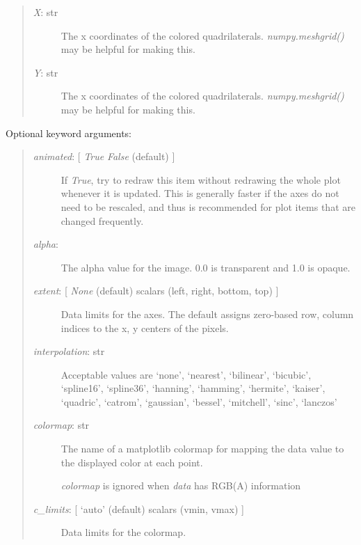 \documentclass[letterpaper,10pt,english]{sphinxmanual}
\begin{document}
\begin{fulllineitems}
\begin{fulllineitems}
\begin{quote}
\begin{description}
\item[{\emph{X}: str}] \leavevmode
The x coordinates of the colored quadrilaterals.
\emph{numpy.meshgrid()} may be helpful for making this.

\item[{\emph{Y}: str}] \leavevmode
The x coordinates of the colored quadrilaterals.
\emph{numpy.meshgrid()} may be helpful for making this.

\end{description}
\end{quote}

Optional keyword arguments:
\begin{quote}
\begin{description}
\item[{\emph{animated}: {[} \emph{True} \textbar{} \emph{False} (default) {]}}] \leavevmode
If \emph{True}, try to redraw this item without redrawing the whole plot
whenever it is updated. This is generally faster if the axes do not
need to be rescaled, and thus is recommended for plot items that 
are changed frequently.

\item[{\emph{alpha}: }] \leavevmode
The alpha value for the image. 0.0 is transparent and 1.0 is opaque.

\item[{\emph{extent}:  {[} \emph{None} (default) \textbar{} scalars (left, right, bottom, top) {]}}] \leavevmode
Data limits for the axes. The default assigns zero-based row, 
column indices to the x, y centers of the pixels.

\item[{\emph{interpolation}: str}] \leavevmode
Acceptable values are `none', `nearest', `bilinear',
`bicubic', `spline16', `spline36', `hanning', `hamming',
`hermite', `kaiser', `quadric', `catrom', `gaussian',
`bessel', `mitchell', `sinc', `lanczos'

\item[{\emph{colormap}: str}] \leavevmode
The name of a matplotlib colormap for mapping the data value to the
displayed color at each point.

\emph{colormap} is ignored when \emph{data} has RGB(A) information

\item[{\emph{c\_limits}:  {[} `auto' (default) \textbar{} scalars (vmin, vmax) {]}}] \leavevmode
Data limits for the colormap.

\end{description}
\end{quote}


\end{fulllineitems}
\end{fulllineitems}
\end{document}
